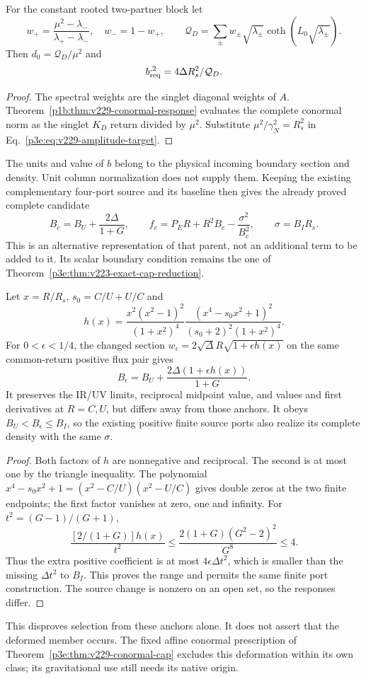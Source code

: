 \documentclass[12pt,a4paper]{article}
\begin{document}
\begin{corollary}
\label{p3e:cor:v229-rooted-amplitude}
For the constant rooted two-partner block let
\[
 w_+=\frac{\mu^2-\lambda_-}{\lambda_+-\lambda_-},\quad w_-=1-w_+,
 \qquad \mathcal Q_D=\sum_{\pm}w_\pm\sqrt{\lambda_\pm}
 \coth(L_0\sqrt{\lambda_\pm}).
\]
Then $d_0=\mathcal Q_D/\mu^2$ and
\[
 b_{\rm req}^{,2}=4\Delta R_s^2/\mathcal Q_D.
\]
\end{corollary}
\begin{proof}
The spectral weights are the singlet diagonal weights of $A$.
Theorem~\ref{p1b:thm:v229-conormal-response} evaluates the complete
conormal norm as the singlet $K_D$ return divided by $\mu^2$.
Substitute $\mu^2/\gamma_N^2=R_s^2$ in
Eq.~\eqref{p3e:eq:v229-amplitude-target}.
\end{proof}
The units and value of $b$ belong to the physical incoming boundary
section and density. Unit column normalization does not supply them.
Keeping the existing complementary four-port source and its baseline
then gives the already proved complete candidate
\[
 B_c=B_U+\frac{2\Delta}{1+G},\qquad
 f_c=P_E R+R^2B_c-\frac{\sigma^2}{B_c^2},\qquad \sigma=B_IR_s.
\]
This is an alternative representation of that parent, not an additional
term to be added to it. Its scalar boundary condition remains the one
of Theorem~\ref{p3e:thm:v223-exact-cap-reduction}.

\begin{proposition}
\label{p3e:prop:v229-source-counterfamily}
Let $x=R/R_s$, $s_0=C/U+U/C$ and
\[
 h(x)=\frac{x^2(x^2-1)^2}{(1+x^2)^4}
 \frac{(x^4-s_0x^2+1)^2}{(s_0+2)^2(1+x^2)^4}.
\]
For $0<\epsilon<1/4$, the changed section
$w_\epsilon=2\sqrt\Delta R\sqrt{1+\epsilon h(x)}$ on the same
common-return positive flux pair gives
\[
 B_\epsilon=B_U+\frac{2\Delta(1+\epsilon h(x))}{1+G}.
\]
It preserves the IR/UV limits, reciprocal midpoint value, and values
and first derivatives at $R=C,U$, but differs away from those anchors.
It obeys $B_U<B_\epsilon\le B_I$, so the existing positive finite
source ports also realize its complete density with the same $\sigma$.
\end{proposition}
\begin{proof}
Both factors of $h$ are nonnegative and reciprocal. The second is at
most one by the triangle inequality. The polynomial
$x^4-s_0x^2+1=(x^2-C/U)(x^2-U/C)$ gives double zeros at the two
finite endpoints; the first factor vanishes at zero, one and infinity.
For $t^2=(G-1)/(G+1)$,
\[
 \frac{[2/(1+G)]h(x)}{t^2}
 \le\frac{2(1+G)(G^2-2)^2}{G^8}\le4.
\]
Thus the extra positive coefficient is at most $4\epsilon\Delta t^2$,
which is smaller than the missing $\Delta t^2$ to $B_I$.
This proves the range and permits the same finite port construction.
The source change is nonzero on an open set, so the responses differ.
\end{proof}
This disproves selection from these anchors alone. It does not assert
that the deformed member occurs. The fixed affine conormal prescription
of Theorem~\ref{p3e:thm:v229-conormal-cap} excludes this deformation
within its own class; its gravitational use still needs its native origin.
\end{document}

